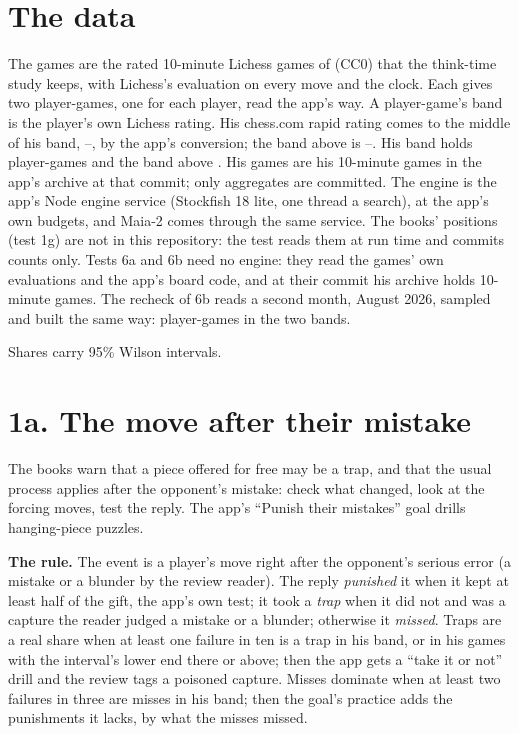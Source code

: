 \documentclass[11pt]{article}
\begin{document}
\begin{table}[h]
\centering
\small\VerdictTable
\caption{The nine tests, what each rule decided, and what the app took.}
\label{tab:verdicts}
\end{table}

\section{The data}

The games are the \GamesRead{} rated 10-minute Lichess games of \Month{} (CC0) that the
think-time study keeps, with Lichess's evaluation on every move and the clock. Each gives two
player-games, one for each player, read the app's way. A player-game's band is the player's own
Lichess rating. His chess.com rapid rating comes to the middle of his band, \HisLo--\HisHi, by the
app's conversion; the band above is \AboveLo--\AboveHi. His band holds \HisPlayerGames{}
player-games and the band above \AbovePlayerGames. His games are his \ArchiveGames{} 10-minute games
in the app's archive at that commit; only aggregates are committed. The engine is the app's Node
engine service (Stockfish 18 lite, one thread a search), at the app's own budgets, and Maia-2 comes
through the same service. The books' positions (test 1g) are not in this repository: the test reads
them at run time and commits counts only. Tests 6a and 6b need no engine: they read the games' own
evaluations and the app's board code, and at their commit his archive holds \LaterArchiveGames{}
10-minute games. The recheck of 6b reads a second month, August 2026, sampled and built the same
way: \LostTradesAugGames{} player-games in the two bands.

Shares carry 95\% Wilson intervals.

\section{1a. The move after their mistake}

The books warn that a piece offered for free may be a trap, and that the usual process applies after
the opponent's mistake: check what changed, look at the forcing moves, test the reply. The app's
``Punish their mistakes'' goal drills hanging-piece puzzles.

\textbf{The rule.} The event is a player's move right after the opponent's serious error (a mistake
or a blunder by the review reader). The reply \emph{punished} it when it kept at least half of the
gift, the app's own test; it took a \emph{trap} when it did not and was a capture the reader judged a
mistake or a blunder; otherwise it \emph{missed}. Traps are a real share when at least one failure
in ten is a trap in his band, or in his games with the interval's lower end there or above; then the
app gets a ``take it or not'' drill and the review tags a poisoned capture. Misses dominate when at
least two failures in three are misses in his band; then the goal's practice adds the punishments it
lacks, by what the misses missed.
\end{document}
